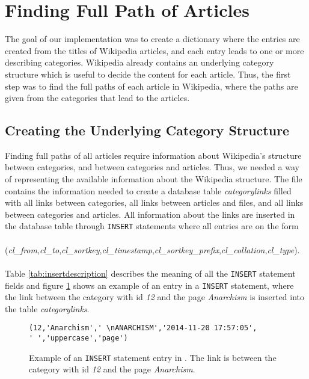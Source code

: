 \section{Finding Full Path of Articles}
\label{sec:finding_full_path_of_articles}
The goal of our implementation was to create a dictionary where the entries are created from the titles of Wikipedia articles, and each entry leads to one or more describing categories. Wikipedia already contains an underlying category structure which is useful to decide the content for each article. Thus, the first step was to find the full paths of each article in Wikipedia, where the paths are given from the categories that lead to the articles. 



\subsection{Creating the Underlying Category Structure}
Finding full paths of all articles require information about Wikipedia's structure between categories, and between categories and articles. Thus, we needed a way of representing the available information about the Wikipedia structure. %
The file \enwikicatlink contains the information needed to create a database table \emph{categorylinks} filled with all links between categories, all links between articles and files, and all links between categories and articles. All information about the links are inserted in the database table through \texttt{INSERT} statements where all entries are on the form\\\\
(\emph{cl\_from},\emph{cl\_to},\emph{cl\_sortkey},\emph{cl\_timestamp},\emph{cl\_sortkey\_prefix},\emph{cl\_collation},\emph{cl\_type}).\\\\
    Table \ref{tab:insertdescription} describes the meaning of all the \texttt{INSERT} statement fields \cite{wiki:categorylinkstable} and figure \ref{fig:entryexample} shows an example of an entry in a \texttt{INSERT} statement, where the link between the category with id \emph{12} and the  page \emph{Anarchism} is inserted into the table \emph{categorylinks}.  


\begin{figure}[h]
\centering
\begin{lstlisting}
(12,'Anarchism',' \nANARCHISM','2014-11-20 17:57:05',
' ','uppercase','page')
\end{lstlisting}
\caption[\texttt{INSERT} statement entry in \texttt{enwiki-latest-categorylinks.sql.gz}]{Example of an \texttt{INSERT} statement entry in \enwikicatlink. The link is between the category with id \emph{12} and the page \emph{Anarchism}.}
\label{fig:entryexample}
\end{figure}


